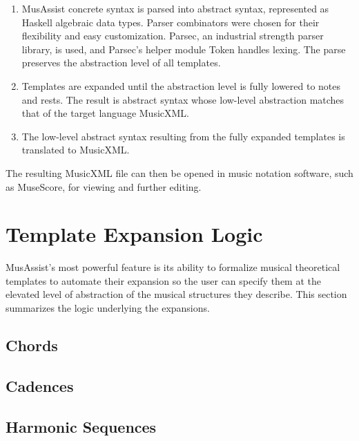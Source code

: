 \documentclass{article}
\begin{document}
\begin{enumerate}
  \item MusAssist concrete syntax is parsed into abstract syntax, represented as 
  Haskell algebraic data types. Parser combinators were chosen for their flexibility
  and easy customization. Parsec, an industrial strength parser library, is used, and 
  Parsec’s helper module Token handles lexing. The parse preserves the abstraction 
  level of all templates.

  \item Templates are expanded until the abstraction level is fully lowered to notes and
  rests. The result is abstract syntax whose low-level abstraction
  matches that of the target language MusicXML. 

  \item The low-level abstract syntax resulting from the fully expanded templates is 
  translated to MusicXML.
\end{enumerate}

The resulting MusicXML file can then be opened in music notation software, such as MuseScore,
for viewing and further editing. 

\section{Template Expansion Logic}
MusAssist's most powerful feature is its ability to formalize musical theoretical templates 
to automate their expansion so the user can specify them at the elevated level of abstraction 
of the musical structures they describe. This section summarizes the logic underlying the expansions.

\subsection{Chords}
\subsection{Cadences}
\subsection{Harmonic Sequences}
\end{document}
